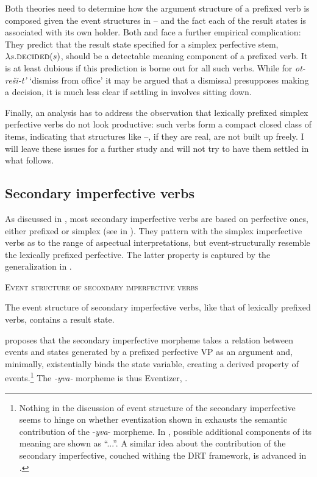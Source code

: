 \documentclass[output=paper,colorlinks,citecolor=brown]{langscibook}
\begin{document}
Both theories need to determine how the argument structure of a prefixed verb is composed given the event structures in -- and the fact each of the result states is associated with its own holder. Both  and  face a further empirical complication: They predict that the result state specified for a simplex perfective stem, $\lambda s.\textsc{decided}(s)$, should be a detectable meaning component of a prefixed verb. It is at least dubious if this prediction is borne out for all such verbs. While for \textit{ot-reši-t’} ‘dismiss from office’ it may be argued that a dismissal presupposes making a decision,  it is much less clear if settling in  involves sitting down.

Finally, an analysis has to address the observation that lexically prefixed simplex perfective verbs do not look productive: such verbs form a compact closed class of items, indicating that structures like --, if they are real, are not built up freely. I will leave these issues for a further study and will not try to have them settled in what follows.

\subsection{Secondary imperfective verbs}\label{tat:sec:2.2}
\hypertarget{RefHeadingToc164647623}{}
As discussed in , most secondary imperfective verbs are based on perfective ones, either prefixed or simplex (see  in ). They pattern with the simplex imperfective verbs as to the range of aspectual interpretations, but event-structurally resemble the lexically prefixed perfective. The latter property is captured by the generalization in . 

 \ea    \textsc{Event structure of secondary imperfective verbs}\label{tat:ex:54}

  The event structure of secondary imperfective verbs, like that of lexically prefixed verbs, contains a result state. 
\z 

\noindent \citet{Tatevosov2016} proposes that the secondary imperfective morpheme takes a relation between events and states generated by a prefixed perfective VP as an argument and, minimally, existentially binds the state variable, creating a derived property of events.\footnote{Nothing in the discussion of event structure of the secondary imperfective seems to hinge on whether eventization shown in  exhausts the semantic contribution of the -\textit{yva}- morpheme. In , possible additional components of its meaning are shown as “...”. A similar idea about the contribution of the secondary imperfective, couched withing the DRT framework, is advanced in .}  The \textit{-yva-} morpheme is thus   Eventizer, . 
\end{document}
